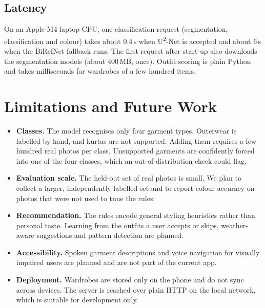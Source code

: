 \documentclass[conference]{IEEEtran}
\begin{document}
\subsection{Latency}
On an Apple M4 laptop CPU, one classification request (segmentation, classification and colour) takes about 0.4\,s when U\textsuperscript{2}-Net is accepted and about 6\,s when the BiRefNet fallback runs. The first request after start-up also downloads the segmentation models (about 400\,MB, once). Outfit scoring is plain Python and takes milliseconds for wardrobes of a few hundred items.

\section{Limitations and Future Work}
\begin{itemize}
  \item \textbf{Classes.} The model recognises only four garment types. Outerwear is labelled by hand, and kurtas are not supported. Adding them requires a few hundred real photos per class. Unsupported garments are confidently forced into one of the four classes, which an out-of-distribution check could flag.
  \item \textbf{Evaluation scale.} The held-out set of real photos is small. We plan to collect a larger, independently labelled set and to report colour accuracy on photos that were not used to tune the rules.
  \item \textbf{Recommendation.} The rules encode general styling heuristics rather than personal taste. Learning from the outfits a user accepts or skips, weather-aware suggestions and pattern detection are planned.
  \item \textbf{Accessibility.} Spoken garment descriptions and voice navigation for visually impaired users are planned and are not part of the current app.
  \item \textbf{Deployment.} Wardrobes are stored only on the phone and do not sync across devices. The server is reached over plain HTTP on the local network, which is suitable for development only.
\end{itemize}

\end{document}
